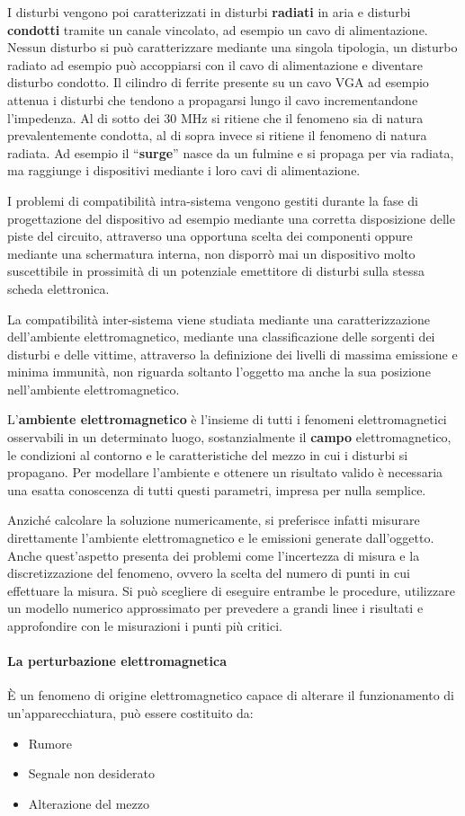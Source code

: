 I disturbi vengono poi caratterizzati in disturbi \textbf{radiati} in aria e disturbi \textbf{condotti} tramite
un canale vincolato, ad esempio un cavo di alimentazione.
Nessun disturbo si può caratterizzare mediante una singola tipologia, %
un disturbo radiato ad esempio può accoppiarsi con il cavo di alimentazione e diventare disturbo condotto.
Il cilindro di ferrite presente su un cavo VGA ad esempio attenua i disturbi che tendono a propagarsi lungo il cavo
incrementandone l'impedenza.
\newpage
Al di sotto dei 30 MHz si ritiene che il fenomeno sia di natura prevalentemente condotta,
al di sopra invece si ritiene il fenomeno di natura radiata. Ad esempio il ``\textbf{surge}'' nasce da un fulmine e si
propaga per via radiata, ma raggiunge i dispositivi mediante i loro cavi di alimentazione.

I problemi di compatibilità intra-sistema vengono gestiti durante la fase di progettazione del dispositivo
ad esempio mediante una corretta disposizione delle piste del circuito, attraverso una opportuna scelta dei 
componenti oppure mediante una schermatura interna, non disporrò mai un dispositivo molto suscettibile
in prossimità di un potenziale emettitore di disturbi sulla stessa scheda elettronica.

La compatibilità inter-sistema viene studiata mediante una caratterizzazione dell'ambiente elettromagnetico, 
mediante una classificazione delle sorgenti dei disturbi e delle vittime, attraverso la definizione dei livelli di massima
emissione e minima immunità, non riguarda soltanto l'oggetto ma anche la sua posizione nell'ambiente
elettromagnetico.
\medskip

L'\textbf{ambiente elettromagnetico} è l'insieme di tutti i fenomeni elettromagnetici osservabili in un
determinato luogo, sostanzialmente il \textbf{campo} elettromagnetico, le condizioni al contorno e le caratteristiche
del mezzo in cui i disturbi si propagano. Per modellare l'ambiente e ottenere un risultato valido
è necessaria una esatta conoscenza di tutti questi parametri, impresa per nulla semplice.

Anziché calcolare la soluzione numericamente, si preferisce infatti misurare direttamente l'ambiente
elettromagnetico e le emissioni generate dall'oggetto. Anche quest'aspetto presenta dei problemi come
l'incertezza di misura e la discretizzazione del fenomeno, ovvero la scelta del numero di punti in cui effettuare
la misura.
Si può scegliere di eseguire entrambe le procedure, utilizzare un modello numerico approssimato per 
prevedere a grandi linee i risultati e approfondire con le misurazioni i punti più critici.

\paragraph{La perturbazione elettromagnetica}
È un fenomeno di origine elettromagnetico capace di alterare il funzionamento di un'apparecchiatura,
può essere costituito da:
\begin{itemize}
\item Rumore
\item Segnale non desiderato
\item Alterazione del mezzo
\end{itemize}
